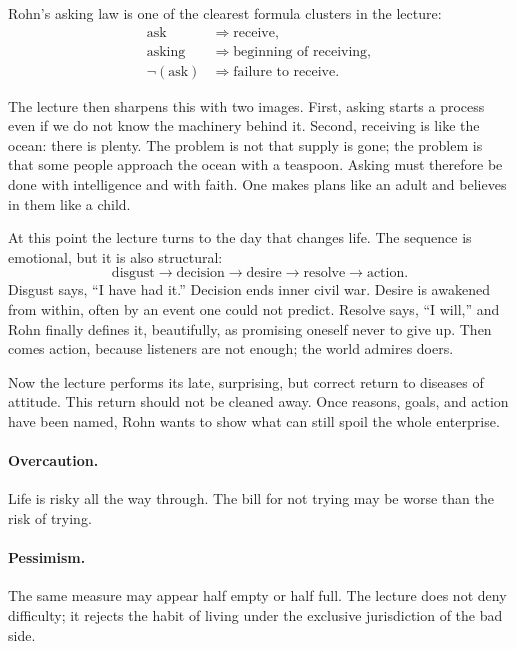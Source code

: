 Rohn's asking law is one of the clearest formula clusters in the lecture:
\begin{align}
\text{ask} &\Rightarrow \text{receive},\\
\text{asking} &\Rightarrow \text{beginning of receiving},\\
\neg(\text{ask}) &\Rightarrow \text{failure to receive}.
\end{align}

The lecture then sharpens this with two images. First, asking starts a process even if we do not know the machinery behind it. Second, receiving is like the ocean: there is plenty. The problem is not that supply is gone; the problem is that some people approach the ocean with a teaspoon. Asking must therefore be done with intelligence and with faith. One makes plans like an adult and believes in them like a child.

At this point the lecture turns to the day that changes life. The sequence is emotional, but it is also structural:
\begin{equation}
\text{disgust} \to \text{decision} \to \text{desire} \to \text{resolve} \to \text{action}.
\end{equation}
Disgust says, ``I have had it.'' Decision ends inner civil war. Desire is awakened from within, often by an event one could not predict. Resolve says, ``I will,'' and Rohn finally defines it, beautifully, as promising oneself never to give up. Then comes action, because listeners are not enough; the world admires doers.

Now the lecture performs its late, surprising, but correct return to diseases of attitude. This return should not be cleaned away. Once reasons, goals, and action have been named, Rohn wants to show what can still spoil the whole enterprise.

\paragraph{Overcaution.} Life is risky all the way through. The bill for not trying may be worse than the risk of trying.

\paragraph{Pessimism.} The same measure may appear half empty or half full. The lecture does not deny difficulty; it rejects the habit of living under the exclusive jurisdiction of the bad side.

